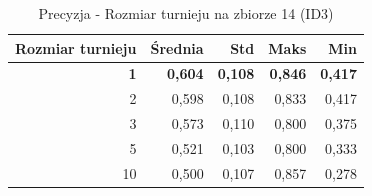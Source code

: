 \begin{table}[htbp]
\centering
\small
\setlength{\tabcolsep}{6pt}
\renewcommand{\arraystretch}{1.2}
\caption{Precyzja - Rozmiar turnieju na zbiorze 14 (ID3)}
\label{tab:ID3_tournament_size_14_precision}
\begin{tabular}{r|r|r|r|r}
\toprule
Rozmiar turnieju & Średnia & Std & Maks & Min \\
\hline
\textbf{1} & \textbf{0,604} & \textbf{0,108} & \textbf{0,846} & \textbf{0,417} \\
2 & 0,598 & 0,108 & 0,833 & 0,417 \\
3 & 0,573 & 0,110 & 0,800 & 0,375 \\
5 & 0,521 & 0,103 & 0,800 & 0,333 \\
10 & 0,500 & 0,107 & 0,857 & 0,278 \\
\bottomrule
\end{tabular}
\end{table}